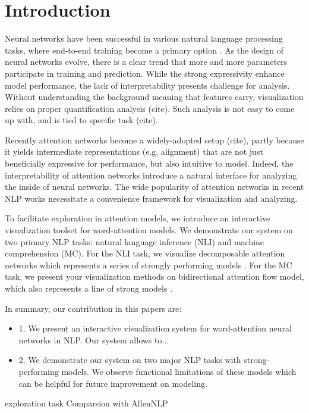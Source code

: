 \section{Introduction}

Neural networks have been successful in various natural language processing tasks,
where end-to-end training become a primary option \cite{Seo2016}.
As the design of neural networks evolve, there is a clear trend that more and more
parameters participate in training and prediction. While the strong expressivity
enhance model performance, the lack of interpretability presents challenge for analysis.
Without understanding the background meaning that features carry, visualization relies
on proper quantification analysis (cite). Such analysis is not easy to come up with,
and is tied to specific task (cite).


Recently attention networks become a widely-adopted setup (cite), partly because it yields
intermediate representations (e.g. alignment) that are not just beneficially expressive for performance,
but also intuitive to model. Indeed, the interpretability of attention networks introduce
a natural interface for analyzing the inside of neural networks. The wide popularity of attention networks
in recent NLP works necessitate a convenience framework for visualization and analyzing.

To facilitate exploration in attention models, we introduce an interactive visualization toolset
for word-attention models. We demonstrate our system on two primary NLP tasks: natural language
inference (NLI) and machine comprehension (MC). For the NLI task, we visualize
decomposable attention networks which represents a series of strongly performing models \cite{}.
For the MC task, we present your visualization methods on bidirectional attention flow model,
which also represents a line of strong models \cite{}.

In summary, our contribution in this papers are:
\begin{itemize}
	\item 1. We present an interactive visualization system for word-attention neural
	networks in NLP. Our system allows to...
	\item 2. We demonstrate our system on two major NLP tasks with strong-performing
	models. We observe functional limitations of these models which can be helpful
	for future improvement on modeling.
\end{itemize}


exploration task
\cite{Seo2016}
Comparsion with AllenNLP
